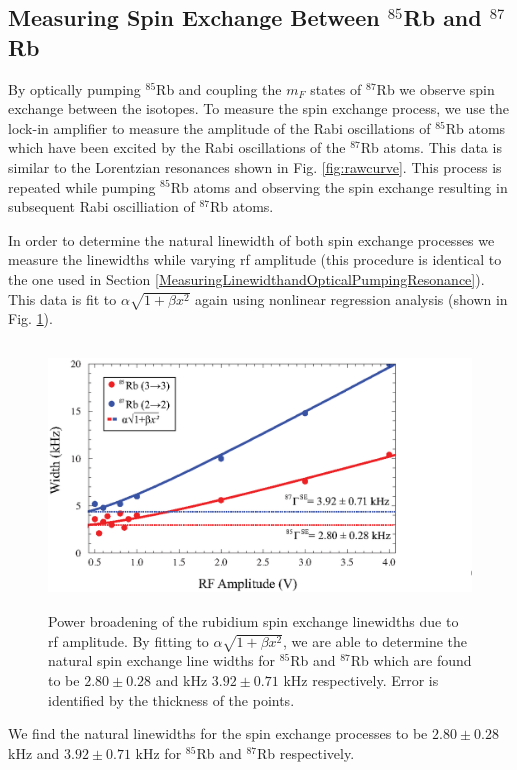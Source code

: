 \subsection{Measuring Spin Exchange Between $^{85}$Rb and $^{87}$Rb}\label{MeasuringSpinExchange}
By optically pumping $^{85}$Rb and coupling the $m_F$ states of $^{87}$Rb we observe spin exchange between the isotopes. To measure the spin exchange process, we use the lock-in amplifier to measure the amplitude of the Rabi oscillations of $^{85}$Rb atoms which have been excited by the Rabi oscillations of the $^{87}$Rb atoms.  This data is similar to the Lorentzian resonances shown in Fig. \ref{fig:rawcurve}.  This process is repeated while pumping $^{85}$Rb atoms and observing the spin exchange resulting in subsequent Rabi oscilliation of $^{87}$Rb atoms.

In order to determine the natural linewidth of both spin exchange processes we measure the linewidths while varying rf amplitude (this procedure is identical to the one used in Section \ref{MeasuringLinewidthandOpticalPumpingResonance}).  This data is fit to $\alpha \sqrt{1+\beta x^2}$ again using nonlinear regression analysis (shown in Fig. \ref{fig: spinexchange}).
\begin{figure}[htbp]
\begin{center}
\includegraphics[height=70mm]{./figures/spin_exchange.eps}
\caption{\small{Power broadening of the rubidium spin exchange linewidths due to rf amplitude. By fitting to $\alpha \sqrt{1+\beta x^2}$, we are able to determine the natural spin exchange line widths for $^{85}$Rb and $^{87}$Rb which are found to be $2.80 \pm 0.28$ and kHz $3.92 \pm 0.71$ kHz respectively.  Error is identified by the thickness of the points.}}\label{fig: spinexchange}
\end{center}
\end{figure}
We find the natural linewidths for the spin exchange processes to be $2.80 \pm 0.28$ kHz and $3.92 \pm 0.71$ kHz for $^{85}$Rb and $^{87}$Rb respectively.